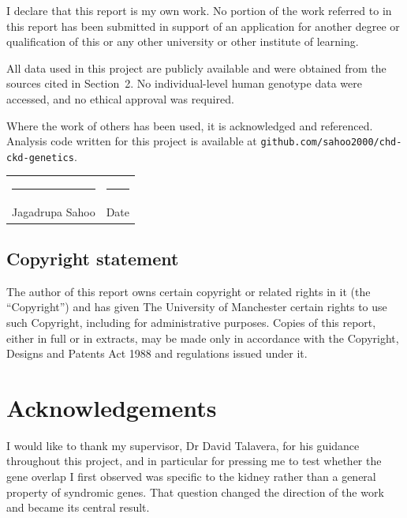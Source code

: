 \documentclass[11pt,a4paper]{article}
\begin{document}
I declare that this report is my own work. No portion of the work referred to in this
report has been submitted in support of an application for another degree or qualification
of this or any other university or other institute of learning.

All data used in this project are publicly available and were obtained from the sources
cited in Section~2. No individual-level human genotype data were accessed, and no ethical
approval was required.

Where the work of others has been used, it is acknowledged and referenced. Analysis code
written for this project is available at
\texttt{github.com/sahoo2000/chd-ckd-genetics}.

\vspace{2cm}

\begin{tabular}{@{}p{7cm}p{6cm}@{}}
\rule{6.5cm}{0.4pt} & \rule{5.5cm}{0.4pt} \\
Jagadrupa Sahoo & Date \\
\end{tabular}

\vspace{1.5cm}

\subsection*{Copyright statement}

The author of this report owns certain copyright or related rights in it (the
``Copyright'') and has given The University of Manchester certain rights to use such
Copyright, including for administrative purposes. Copies of this report, either in full or
in extracts, may be made only in accordance with the Copyright, Designs and Patents Act
1988 and regulations issued under it.

\newpage
\section*{Acknowledgements}

I would like to thank my supervisor, Dr David Talavera, for his guidance throughout this
project, and in particular for pressing me to test whether the gene overlap I first
observed was specific to the kidney rather than a general property of syndromic genes. That
question changed the direction of the work and became its central result.
\end{document}
